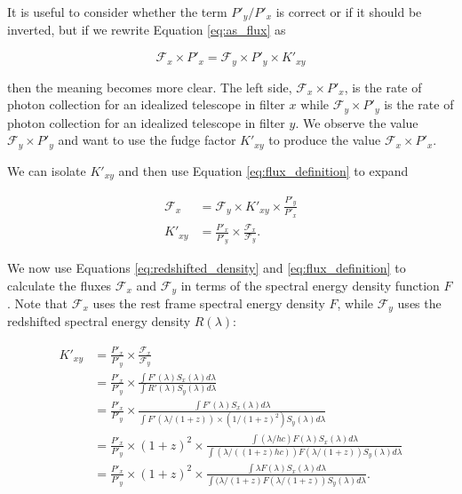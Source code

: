 \documentclass[linenumbers]{aastex631}
\begin{document}
It is useful to consider whether the term $P'_y / P'_x$ is correct or if
it should be inverted, but if we rewrite Equation \ref{eq:as_flux} as

\begin{equation}
  \mathcal{F}_x \times P'_x = \mathcal{F}_y \times P'_y \times K'_{xy}
\end{equation}

\noindent then the meaning becomes more clear. The left side, $\mathcal{F}_x
\times P'_x$, is the rate of photon collection for an idealized telescope in
filter $x$ while $\mathcal{F}_y \times P'_y$ is the rate of photon collection
for an idealized telescope in filter $y$. We observe the value $\mathcal{F}_y
\times P'_y$ and want to use the fudge factor $K'_{xy}$ to produce the value
$\mathcal{F}_x \times P'_x$.

We can isolate $K'_{xy}$ and then use Equation \ref{eq:flux_definition} to expand

\begin{equation}
\begin{aligned}
  \mathcal{F}_x &= \mathcal{F}_y \times K'_{xy} \times \frac{P'_y}{P'_x} \\
        K'_{xy} &= \frac{P'_x}{P'_y} \times \frac{\mathcal{F}_x}{\mathcal{F}_y} .
\end{aligned}
\end{equation}

We now use Equations \ref{eq:redshifted_density} and \ref{eq:flux_definition}
to calculate the fluxes $\mathcal{F}_x$ and $\mathcal{F}_y$ in terms of the
spectral energy density function $F$. Note that $\mathcal{F}_x$ uses the rest
frame spectral energy density $F$, while $\mathcal{F}_y$ uses the redshifted
spectral energy density $R(\lambda)$:

\begin{equation}
\begin{aligned}
  K'_{xy} &= \frac{P'_x}{P'_y} \times \frac{\mathcal{F}_x}{\mathcal{F}_y} \\
         &= \frac{P'_x}{P'_y} \times
              \frac{\int F'(\lambda) S_x(\lambda) d\lambda}
                   {\int R'(\lambda) S_y(\lambda) d\lambda} \\
         &= \frac{P'_x}{P'_y} \times
              \frac{\int F'(\lambda) S_x(\lambda) d\lambda}
                   {\int F'(\lambda / (1+z)) \times (1 / (1 + z)^2) S_y(\lambda) d\lambda} \\
         &= \frac{P'_x}{P'_y} \times (1+z)^2 \times
              \frac{\int (\lambda / hc) F(\lambda) S_x(\lambda) d\lambda}
                   {\int (\lambda / ((1+z)hc)) F(\lambda / (1+z)) S_y(\lambda) d\lambda} \\
         &= \frac{P'_x}{P'_y} \times (1 + z)^2 \times
              \frac{\int \lambda F(\lambda) S_x(\lambda) d\lambda}
                   {\int (\lambda / (1+z) F(\lambda / (1+z)) S_y(\lambda) d\lambda} .
\end{aligned}
\end{equation}
\end{document}
